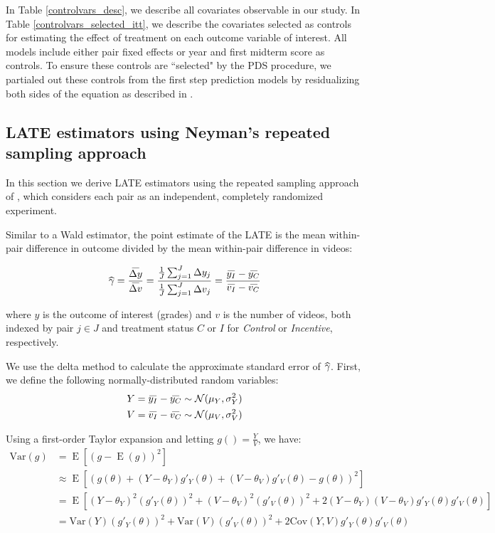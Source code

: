 \documentclass[12pt]{article}
\newcommand\wh[1]{\hstretch{2}{\hat{\hstretch{.5}{#1}}}}
\newcommand\wb[1]{\hstretch{2}{\bar{\hstretch{.5}{#1}}}}
\begin{document}
In Table \ref{controlvars_desc}, we describe all covariates observable in our study. In Table \ref{controlvars_selected_itt}, we describe the covariates selected as controls for estimating the effect of treatment on each outcome variable of interest. All models include either pair fixed effects or year and first midterm score as controls. To ensure these controls are ``selected" by the PDS procedure, we partialed out these controls from the first step prediction models by residualizing both sides of the equation as described in \textcite{bch2014b}.

\subsection{LATE estimators using Neyman's repeated sampling approach} \label{a_neyman_late}

In this section we derive LATE estimators using the repeated sampling approach of \textcite{neyman1923}, which considers each pair as an independent, completely randomized experiment.

Similar to a Wald estimator, the point estimate of the LATE is the mean within-pair difference in outcome divided by the mean within-pair difference in videos:

\begin{equation} \label{neyman_late_spec}
	\wh{\gamma} = \frac{\wb{\Delta y}}{\wb{\Delta v}} = \frac{\frac{1}{J}\sum_{j=1}^{J} \Delta y_j }{\frac{1}{J}\sum_{j=1}^{J} \Delta v_j} = \frac{\wb{y_I} - \wb{y_C}}{\wb{v_I} - \wb{v_C}}
\end{equation}

where $y$ is the outcome of interest (grades) and $v$ is the number of videos, both indexed by pair $j\in J$ and treatment status $C$ or $I$ for \textit{Control} or \textit{Incentive}, respectively.

We use the delta method to calculate the approximate standard error of $\wh{\gamma}$. First, we define the following normally-distributed random variables:
\begin{equation}
\begin{split}
Y = \wb{y_I} - \wb{y_C} \sim \mathcal{N}(\mu_Y, \sigma^2_Y) \\
V = \wb{v_I} - \wb{v_C} \sim \mathcal{N}(\mu_V, \sigma^2_V)
\end{split}
\end{equation}

Using a first-order Taylor expansion and letting $g() = \frac{Y}{V}$, we have:
\begin{equation}
\begin{split}
	\text{Var}(g) & = \operatorname{E}[(g - \operatorname{E}(g))^2] \\
	& \approx \operatorname{E}[(g(\theta) + (Y-\theta_Y)g'_Y(\theta) + (V-\theta_V)g'_V(\theta) - g(\theta))^2] \\
	& = \operatorname{E}[(Y-\theta_Y)^2 (g'_Y(\theta))^2 + (V-\theta_V)^2 (g'_V(\theta))^2 + 2(Y-\theta_Y)(V-\theta_V)g'_Y(\theta)g'_V(\theta)] \\
	& = \text{Var}(Y)(g'_Y(\theta))^2 + \text{Var}(V)(g'_V(\theta))^2 + 2\text{Cov}(Y,V)g'_Y(\theta)g'_V(\theta)
\end{split}
\end{equation}
\end{document}
